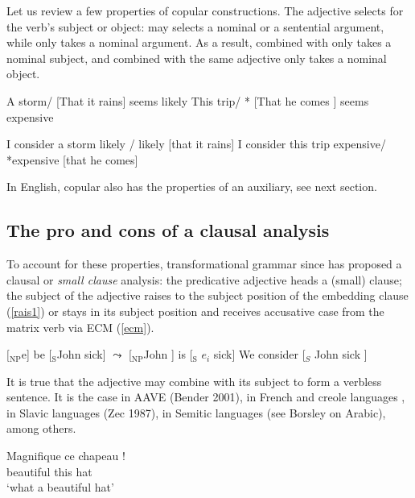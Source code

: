 \documentclass[output=paper]{langsci/langscibook}
\begin{document}
Let us review a few properties of copular constructions.
The adjective selects for the verb's subject or object:  may selects a nominal or a sentential argument, while  only takes a nominal argument. As a result,  combined with  only takes a nominal subject, and  combined with the same adjective only takes a nominal object.


\begin{exe}
\ex \label{storm}
\begin{xlist}
\ex A storm/ [That it rains] seems likely
\ex This trip/ * [That he comes ] seems expensive
\end{xlist}
\ex \begin{xlist}
\ex 	I consider a storm likely / likely [that it rains]
\ex 	I consider this trip expensive/ *expensive [that he comes]
\end{xlist}	
\end{exe}

In English, copular  also has the properties of an auxiliary, see next section.

\subsection{The pro and cons of a clausal analysis}
To account for these properties, transformational grammar since \citet{Chomsky1986, Stowell1983} has proposed a clausal or \emph{small clause} analysis: the predicative adjective heads a (small) clause; the subject of the adjective raises to the subject position of the embedding clause (\ref{rais1}) or stays in its subject position and receives accusative case from the matrix verb via ECM (\ref{ecm}).


\begin{exe}
\ex  $[$$_{\text{NP}}$e] be [$_{\text{S}}$John sick] $\leadsto$  [$_{\text{NP}}$John ] is  [$_{\text{S}}$ $e_{i}$ sick] \label{rais1}
\ex   We consider [$_{S}$ John sick ] \label{ecm}
\end{exe}

It is true that the adjective may combine with its subject to form a verbless sentence. It is the case in AAVE (Bender 2001), in French \citet{Laurens2008} and creole languages \citet{HenriandAbeille2007}, in Slavic languages (Zec 1987), in Semitic languages (see Borsley on Arabic), among others. 

\begin{exe}
\ex \gll Magnifique ce chapeau !\\
beautiful this hat\\
\glt `what a beautiful hat'
\end{exe}
\end{document}
